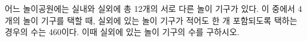 어느 놀이공원에는 실내와 실외에 총 12개의 서로 다른 놀이 기구가 있다. 이 중에서 4개의 놀이 기구를 택할 때, 실외에 있는 놀이 기구가 적어도 한 개 포함되도록 택하는 경우의 수는 460이다. 이때 실외에 있는 놀이 기구의 수를 구하시오.
